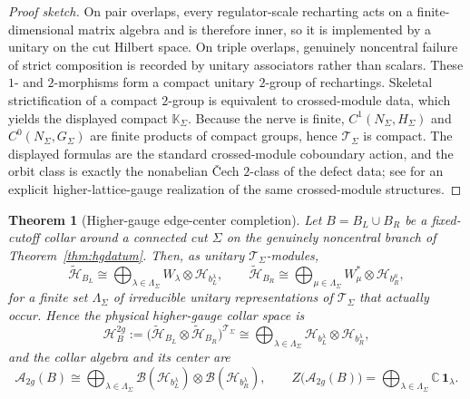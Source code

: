 \documentclass[11pt]{article}
\newtheorem{theorem}{Theorem}[section]
\begin{document}
\begin{proof}[Proof sketch]
On pair overlaps, every regulator-scale recharting acts on a finite-dimensional matrix algebra and is therefore inner, so it is implemented by a unitary on the cut Hilbert space. On triple overlaps, genuinely noncentral failure of strict composition is recorded by unitary associators rather than scalars. These \(1\)- and \(2\)-morphisms form a compact unitary \(2\)-group of rechartings. Skeletal strictification of a compact \(2\)-group is equivalent to crossed-module data, which yields the displayed compact \(\mathbb K_\Sigma\). Because the nerve is finite, \(C^1(N_\Sigma,H_\Sigma)\) and \(C^0(N_\Sigma,G_\Sigma)\) are finite products of compact groups, hence \(\mathcal T_\Sigma\) is compact. The displayed formulas are the standard crossed-module coboundary action, and the orbit class is exactly the nonabelian \v{C}ech \(2\)-class of the defect data; see \cite{bullivant17} for an explicit higher-lattice-gauge realization of the same crossed-module structures.
\end{proof}

\begin{theorem}[Higher-gauge edge-center completion]\label{thm:hgedgecenter}
Let \(B=B_L\cup B_R\) be a fixed-cutoff collar around a connected cut \(\Sigma\) on the genuinely noncentral branch of Theorem~\ref{thm:hgdatum}. Then, as unitary \(\mathcal T_\Sigma\)-modules,
\[
\widetilde{\mathcal H}_{B_L}
\cong
\bigoplus_{\lambda\in\Lambda_\Sigma}
W_\lambda\otimes \mathcal H_{b_L^\lambda},
\qquad
\widetilde{\mathcal H}_{B_R}
\cong
\bigoplus_{\mu\in\Lambda_\Sigma}
W_\mu^*\otimes \mathcal H_{b_R^\mu},
\]
for a finite set \(\Lambda_\Sigma\) of irreducible unitary representations of \(\mathcal T_\Sigma\) that actually occur. Hence the physical higher-gauge collar space is
\[
\mathcal H_B^{2g}
:=
\bigl(\widetilde{\mathcal H}_{B_L}\otimes \widetilde{\mathcal H}_{B_R}\bigr)^{\mathcal T_\Sigma}
\cong
\bigoplus_{\lambda\in\Lambda_\Sigma}
\mathcal H_{b_L^\lambda}\otimes \mathcal H_{b_R^\lambda},
\]
and the collar algebra and its center are
\[
\mathcal A_{2g}(B)
\cong
\bigoplus_{\lambda\in\Lambda_\Sigma}
\mathcal B(\mathcal H_{b_L^\lambda})\otimes
\mathcal B(\mathcal H_{b_R^\lambda}),
\qquad
Z\bigl(\mathcal A_{2g}(B)\bigr)
=
\bigoplus_{\lambda\in\Lambda_\Sigma}\mathbb C\,\mathbf 1_\lambda.
\]
\end{theorem}
\end{document}
